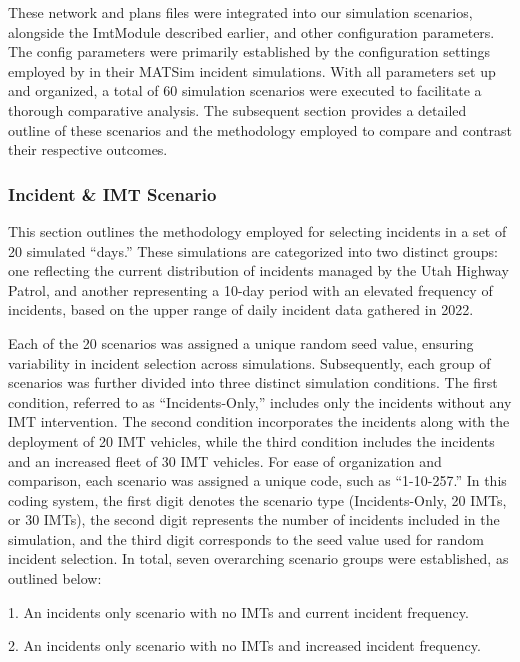 \documentclass[
  letterpaper,
  authoryear]{elsarticle}
\begin{document}
These network and plans files were integrated into our simulation
scenarios, alongside the ImtModule described earlier, and other
configuration parameters. The config parameters were primarily
established by the configuration settings employed by
\citet{kaddoura2018} in their MATSim incident simulations. With all
parameters set up and organized, a total of 60 simulation scenarios were
executed to facilitate a thorough comparative analysis. The subsequent
section provides a detailed outline of these scenarios and the
methodology employed to compare and contrast their respective outcomes.

\hypertarget{incident-imt-scenario}{%
\subsubsection{Incident \& IMT Scenario}\label{incident-imt-scenario}}

This section outlines the methodology employed for selecting incidents
in a set of 20 simulated ``days.'' These simulations are categorized
into two distinct groups: one reflecting the current distribution of
incidents managed by the Utah Highway Patrol, and another representing a
10-day period with an elevated frequency of incidents, based on the
upper range of daily incident data gathered in 2022.

Each of the 20 scenarios was assigned a unique random seed value,
ensuring variability in incident selection across simulations.
Subsequently, each group of scenarios was further divided into three
distinct simulation conditions. The first condition, referred to as
``Incidents-Only,'' includes only the incidents without any IMT
intervention. The second condition incorporates the incidents along with
the deployment of 20 IMT vehicles, while the third condition includes
the incidents and an increased fleet of 30 IMT vehicles. For ease of
organization and comparison, each scenario was assigned a unique code,
such as ``1-10-257.'' In this coding system, the first digit denotes the
scenario type (Incidents-Only, 20 IMTs, or 30 IMTs), the second digit
represents the number of incidents included in the simulation, and the
third digit corresponds to the seed value used for random incident
selection. In total, seven overarching scenario groups were established,
as outlined below:

1. An incidents only scenario with no IMTs and current incident
frequency.

2. An incidents only scenario with no IMTs and increased incident
frequency.
\end{document}
